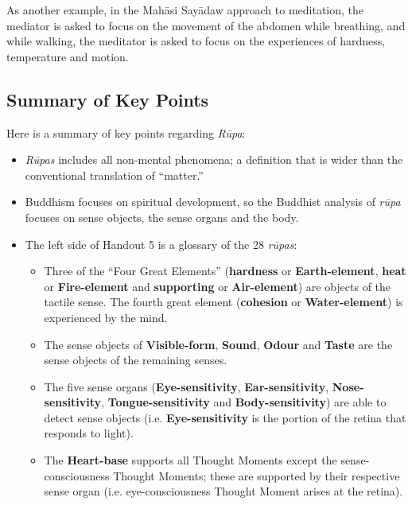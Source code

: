 As another example, in the Mahāsi Sayādaw approach to meditation, the mediator is asked to focus on the movement of the abdomen while breathing, and while walking, the meditator is asked to focus on the experiences of hardness, temperature and motion.

\subsection*{Summary of Key Points}

Here is a summary of key points regarding \textit{Rūpa}:

\begin{itemize}

\item \textit{Rūpas} includes all non-mental phenomena; a definition that is wider than the conventional translation of “matter.”

\item Buddhism focuses on spiritual development, so the Buddhist analysis of \textit{rūpa} focuses on sense objects, the sense organs and the body. 

\item The left side of Handout 5 is a glossary of the 28 \textit{rūpas}:

\begin{itemize}

\item Three of the “Four Great Elements” (\textbf{hardness} or \textbf{Earth-element}, \textbf{heat} or \textbf{Fire-element} and \textbf{supporting} or \textbf{Air-element}) are objects of the tactile sense. The fourth great element (\textbf{cohesion} or \textbf{Water-element}) is experienced by the mind.

\item The sense objects of \textbf{Visible-form}, \textbf{Sound}, \textbf{Odour} and \textbf{Taste} are the sense objects of the remaining senses.

\item The five sense organs (\textbf{Eye-sensitivity}, \textbf{Ear-sensitivity}, \textbf{Nose-sensitivity}, \textbf{Tongue-sensitivity} and \textbf{Body-sensitivity}) are able to detect sense objects (i.e. \textbf{Eye-sensitivity} is the portion of the retina that responds to light).

\item The \textbf{Heart-base} supports all Thought Moments except the sense-consciousness Thought Moments; these are supported by their respective sense organ (i.e. eye-consciousness Thought Moment arises at the retina).


\end{itemize}
\end{itemize}

